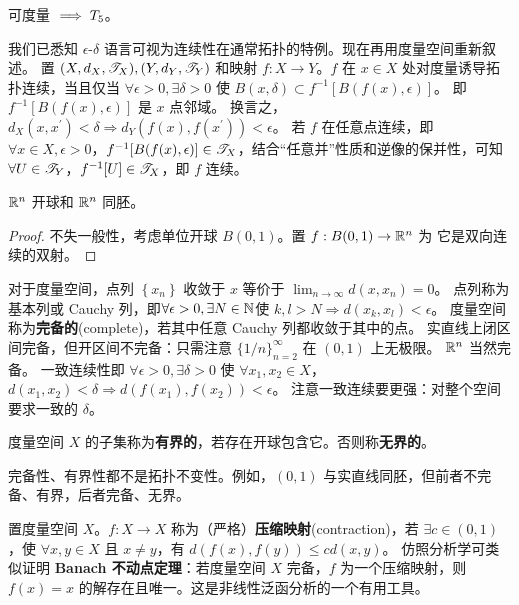 \begin{theorem}
    可度量 $\implies T_5$。
\end{theorem}

我们已悉知 $\epsilon$-$\delta$ 语言可视为连续性在通常拓扑的特例。现在再用度量空间重新叙述。
置 $(X,d_X,\mathscr T_X),(Y,d_Y,\mathscr T_Y)$ 和映射 $f:X\to Y$。$f$ 在 $x \in X$ 处对度量诱导拓扑连续，当且仅当 $\forall\epsilon>0,\exists\delta>0$ 使 $B(x,\delta) \subset f^{-1} [B(f(x),\epsilon)]$。
即 $f^{-1} [B(f(x),\epsilon)]$ 是 $x$ 点邻域。
换言之，$d_X(x,x^{\prime})<\delta\Rightarrow d_Y(f(x),f(x^{\prime}))<\epsilon$。
若 $f$ 在任意点连续，即 $\forall x \in X,\epsilon > 0$，$f^{-1} [B(f(x),\epsilon)]\in\mathscr T_X$，结合“任意并”性质和逆像的保并性，可知 $\forall U\in\mathscr T_Y$，$f^{-1}[U]\in\mathscr T_X$，即 $f$ 连续。

\begin{theorem}
    $\mathbb{R}^n$ 开球和 $\mathbb{R}^n$ 同胚。
\end{theorem}
\begin{proof}
    不失一般性，考虑单位开球 $B(0,1)$。置 $f:B(0,1)\to \mathbb{R}^n$ 为
它是双向连续的双射。
\end{proof}

对于度量空间，点列 $\left\{x_n\right\}$ 收敛于 $x$ 等价于 $\lim_{n\to\infty}d(x, x_n)=0$。
点列称为基本列或 Cauchy 列，即$\forall\epsilon>0,\exists N\in\mathbb{N}$使 $k,l>N\Rightarrow d(x_{k},x_{l})<\epsilon$。
度量空间称为\textbf{完备的}(complete)，若其中任意 Cauchy 列都收敛于其中的点。
%
实直线上闭区间完备，但开区间不完备：只需注意 $\{1/n\}_{n=2}^\infty$ 在 $(0,1)$ 上无极限。
$\mathbb{R}^{n}$ 当然完备。
一致连续性即 $\forall \epsilon>0,\exists\delta>0$ 
使 $\forall x_{1},x_{2} \in X$，$d(x_{1},x_{2})<\delta\Rightarrow d(f(x_{1}),f(x_{2}))<\epsilon$。
注意一致连续要更强：对整个空间要求一致的 $\delta$。

\begin{definition}
    度量空间 $X$ 的子集称为\textbf{有界的}，若存在开球包含它。否则称\textbf{无界的}。
\end{definition}

\begin{remark}
    完备性、有界性都不是拓扑不变性。例如，$(0,1)$ 与实直线同胚，但前者不完备、有界，后者完备、无界。
\end{remark}

置度量空间 $X$。$f: X \to X$ 称为（严格）\textbf{压缩映射}(contraction)，若 $\exists c\in(0,1)$，使 $\forall x,y \in X$ 且 $x\ne y$，有 $d(f(x),f(y)) \leqslant c d(x,y)$。
仿照分析学可类似证明 \textbf{Banach 不动点定理}：若度量空间 $X$ 完备，$f$ 为一个压缩映射，则 $f(x)=x$ 的解存在且唯一。这是非线性泛函分析的一个有用工具。

